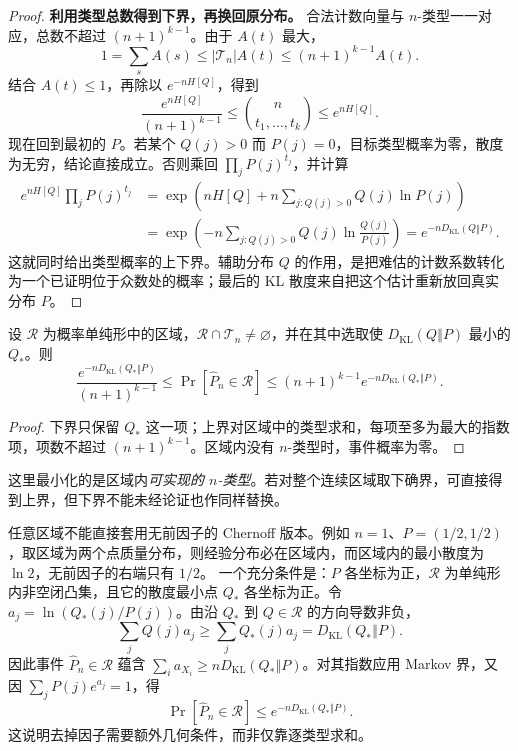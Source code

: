 \documentclass[lang=cn,a4paper,fontset=none,zihao=false,10pt,openany,twoside]{beautybook}
\numberwithin{algorithm}{chapter}
\newcommand{\KLsep}{\mathrel{\Vert}}
\begin{document}
\begin{proof}
\textbf{利用类型总数得到下界，再换回原分布。}
合法计数向量与 $n$-类型一一对应，总数不超过 $(n+1)^{k-1}$。由于 $A(t)$ 最大，
\[
 1=\sum_s A(s)\le |\mathcal T_n|A(t)
 \le(n+1)^{k-1}A(t).
\]
结合 $A(t)\le1$，再除以 $e^{-nH[Q]}$，得到
\[
 \frac{e^{nH[Q]}}{(n+1)^{k-1}}
 \le\binom n{t_1,\ldots,t_k}\le e^{nH[Q]}.
\]
现在回到最初的 $P$。若某个 $Q(j)>0$ 而 $P(j)=0$，目标类型概率为零，散度为无穷，结论直接成立。否则乘回 $\prod_jP(j)^{t_j}$，并计算
\begin{align*}
 e^{nH[Q]}\prod_jP(j)^{t_j}
 &=\exp\left(nH[Q]+n\sum_{j:Q(j)>0}Q(j)\ln P(j)\right)\\
 &=\exp\left(-n\sum_{j:Q(j)>0}Q(j)\ln\frac{Q(j)}{P(j)}\right)
 =e^{-nD_{\mathrm{KL}}(Q\KLsep P)}.
\end{align*}
这就同时给出类型概率的上下界。辅助分布 $Q$ 的作用，是把难估的计数系数转化为一个已证明位于众数处的概率；最后的 KL 散度来自把这个估计重新放回真实分布 $P$。
\end{proof}

\begin{corollary}\label{cor:sanov-finite}
设 $\mathcal R$ 为概率单纯形中的区域，$\mathcal R\cap\mathcal T_n\ne\varnothing$，并在其中选取使 $D_{\mathrm{KL}}(Q\KLsep P)$ 最小的 $Q_*$。则
\[
 \frac{e^{-nD_{\mathrm{KL}}(Q_*\KLsep P)}}{(n+1)^{k-1}}
 \le\Pr[\widehat P_n\in\mathcal R]
 \le(n+1)^{k-1}e^{-nD_{\mathrm{KL}}(Q_*\KLsep P)}.
\]
\end{corollary}
\begin{proof}
下界只保留 $Q_*$ 这一项；上界对区域中的类型求和，每项至多为最大的指数项，项数不超过 $(n+1)^{k-1}$。区域内没有 $n$-类型时，事件概率为零。
\end{proof}
这里最小化的是区域内\emph{可实现的 $n$-类型}。若对整个连续区域取下确界，可直接得到上界，但下界不能未经论证也作同样替换。
\begin{remark}[何时可以去掉多项式因子]
任意区域不能直接套用无前因子的 Chernoff 版本。例如 $n=1$、$P=(1/2,1/2)$，取区域为两个点质量分布，则经验分布必在区域内，而区域内的最小散度为 $\ln2$，无前因子的右端只有 $1/2$。
一个充分条件是：$P$ 各坐标为正，$\mathcal R$ 为单纯形内非空闭凸集，且它的散度最小点 $Q_*$ 各坐标为正。令 $a_j=\ln(Q_*(j)/P(j))$。由沿 $Q_*$ 到 $Q\in\mathcal R$ 的方向导数非负，
\[
 \sum_jQ(j)a_j\ge\sum_jQ_*(j)a_j=D_{\mathrm{KL}}(Q_*\KLsep P).
\]
因此事件 $\widehat P_n\in\mathcal R$ 蕴含 $\sum_i a_{X_i}\ge nD_{\mathrm{KL}}(Q_*\KLsep P)$。对其指数应用 Markov 界，又因 $\sum_jP(j)e^{a_j}=1$，得
\[
 \Pr[\widehat P_n\in\mathcal R]\le e^{-nD_{\mathrm{KL}}(Q_*\KLsep P)}.
\]
这说明去掉因子需要额外几何条件，而非仅靠逐类型求和。
\end{remark}
\end{document}
